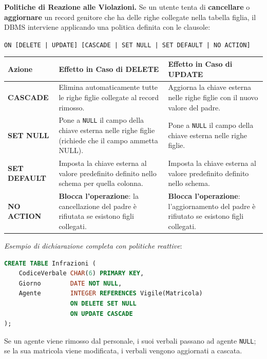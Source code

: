 \documentclass[12pt]{extarticle}
\begin{document}
\medskip
\noindent \textbf{Politiche di Reazione alle Violazioni.} Se un utente tenta di \textbf{cancellare} o \textbf{aggiornare} un record genitore che ha delle righe collegate nella tabella figlia, il DBMS interviene applicando una politica definita con le clausole:
\begin{center}
\texttt{ON [DELETE | UPDATE] [CASCADE | SET NULL | SET DEFAULT | NO ACTION]}
\end{center}

\begin{center}
\small
\begin{tabular}{lp{6.2cm}p{6.2cm}}
    \toprule
    \textbf{Azione} & \textbf{Effetto in Caso di DELETE} & \textbf{Effetto in Caso di UPDATE} \\
    \midrule
    \textbf{CASCADE} & Elimina automaticamente tutte le righe figlie collegate al record rimosso. & Aggiorna la chiave esterna nelle righe figlie con il nuovo valore del padre. \\
    \addlinespace
    \textbf{SET NULL} & Pone a \texttt{NULL} il campo della chiave esterna nelle righe figlie (richiede che il campo ammetta NULL). & Pone a \texttt{NULL} il campo della chiave esterna nelle righe figlie. \\
    \addlinespace
    \textbf{SET DEFAULT} & Imposta la chiave esterna al valore predefinito definito nello schema per quella colonna. & Imposta la chiave esterna al valore predefinito definito nello schema. \\
    \addlinespace
    \textbf{NO ACTION} & \textbf{Blocca l'operazione}: la cancellazione del padre è rifiutata se esistono figli collegati. & \textbf{Blocca l'operazione}: l'aggiornamento del padre è rifiutato se esistono figli collegati. \\
    \bottomrule
\end{tabular}
\end{center}

\medskip
\noindent \textit{Esempio di dichiarazione completa con politiche reattive}:
\begin{lstlisting}[language=SQL]
CREATE TABLE Infrazioni (
    CodiceVerbale CHAR(6) PRIMARY KEY,
    Giorno        DATE NOT NULL,
    Agente        INTEGER REFERENCES Vigile(Matricola)
                  ON DELETE SET NULL
                  ON UPDATE CASCADE
);
\end{lstlisting}
Se un agente viene rimosso dal personale, i suoi verbali passano ad agente \texttt{NULL}; se la sua matricola viene modificata, i verbali vengono aggiornati a cascata.
\end{document}
